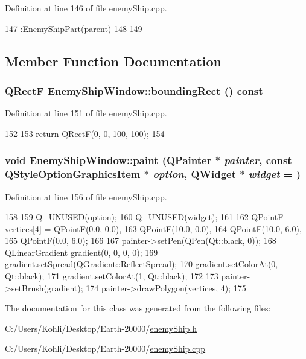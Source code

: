 Definition at line 146 of file enemyShip.cpp.


\begin{DoxyCode}
147         :EnemyShipPart(parent)
148 {
149 }
\end{DoxyCode}


\subsection{Member Function Documentation}
\hypertarget{class_enemy_ship_window_abd9ffd83f2140b9c1aee4cfa91d49045}{
\subsubsection[{boundingRect}]{\setlength{\rightskip}{0pt plus 5cm}QRectF EnemyShipWindow::boundingRect () const}}
\label{class_enemy_ship_window_abd9ffd83f2140b9c1aee4cfa91d49045}


Definition at line 151 of file enemyShip.cpp.


\begin{DoxyCode}
152 {
153     return QRectF(0, 0, 100, 100);
154 }
\end{DoxyCode}
\hypertarget{class_enemy_ship_window_a3a95734ffb128eb9a8ef7b7913755453}{
\subsubsection[{paint}]{\setlength{\rightskip}{0pt plus 5cm}void EnemyShipWindow::paint (QPainter $\ast$ {\em painter}, \/  const QStyleOptionGraphicsItem $\ast$ {\em option}, \/  QWidget $\ast$ {\em widget} = {})}}
\label{class_enemy_ship_window_a3a95734ffb128eb9a8ef7b7913755453}


Definition at line 156 of file enemyShip.cpp.


\begin{DoxyCode}
158 {
159     Q_UNUSED(option);
160     Q_UNUSED(widget);
161 
162     QPointF vertices[4] = {QPointF(0.0, 0.0),
163                                      QPointF(10.0, 0.0),
164                                      QPointF(10.0, 6.0),
165                                      QPointF(0.0, 6.0)};
166 
167     painter->setPen(QPen(Qt::black, 0));
168     QLinearGradient gradient(0, 0, 0, 0);
169     gradient.setSpread(QGradient::ReflectSpread);
170     gradient.setColorAt(0, Qt::black);
171     gradient.setColorAt(1, Qt::black);
172 
173     painter->setBrush(gradient);
174     painter->drawPolygon(vertices, 4);
175 }
\end{DoxyCode}


The documentation for this class was generated from the following files:\begin{DoxyCompactItemize}
\item 
C:/Users/Kohli/Desktop/Earth-\/20000/\hyperlink{enemy_ship_8h}{enemyShip.h}\item 
C:/Users/Kohli/Desktop/Earth-\/20000/\hyperlink{enemy_ship_8cpp}{enemyShip.cpp}\end{DoxyCompactItemize}
